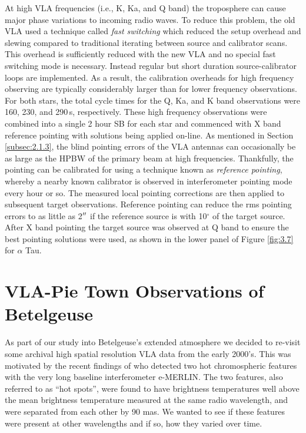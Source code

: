 At high VLA frequencies (i.e., K, Ka, and Q band) the troposphere can cause major phase variations to incoming radio waves. To reduce this problem, the old VLA used a technique called \textit{fast switching} \citep{carilli_1996} which reduced the setup overhead and slewing compared to traditional iterating between source and calibrator scans. This overhead is sufficiently reduced with the new VLA and no special fast switching mode is necessary. Instead regular but short duration source-calibrator loops are implemented. As a result, the calibration overheads for high frequency observing are typically considerably larger than for lower frequency observations. For both stars, the total cycle times for the Q, Ka, and K band observations were 160, 230, and 290\,s, respectively. These high frequency observations were combined into a single 2 hour SB for each star and commenced with X band reference pointing with solutions being applied on-line. As mentioned in Section \ref{subsec:2.1.3}, the blind pointing errors of the VLA antennas can occasionally be as large as the HPBW of the primary beam at high frequencies. Thankfully, the pointing can be calibrated for using a technique known as \textit{reference pointing}, whereby a nearby known calibrator is observed in interferometer pointing mode every hour or so. The measured local pointing corrections are then applied to subsequent target observations. Reference pointing can reduce the rms pointing errors to as little as 2$^{\prime\prime}$ if the reference source is with 10$^\circ$ of the target source. After X band pointing the target source was observed at Q band to ensure the best pointing solutions were used, as shown in the lower panel of Figure \ref{fig:3.7} for $\alpha$ Tau.  

\section{VLA-Pie Town Observations of Betelgeuse}\label{sec:3.7}

As part of our study into Betelgeuse's extended atmosphere we decided to re-visit some archival high spatial resolution VLA data from the early 2000's. This was motivated by the recent findings of \cite{richards_2013} who detected two hot chromospheric features  with the very long baseline interferometer e-MERLIN. The two features, also referred to as ``hot spots'', were found to have brightness temperatures well above the mean brightness temperature measured at the same radio wavelength, and were separated from each other by 90 mas. We wanted to see if these features were present at other wavelengths and if so, how they varied over time.

